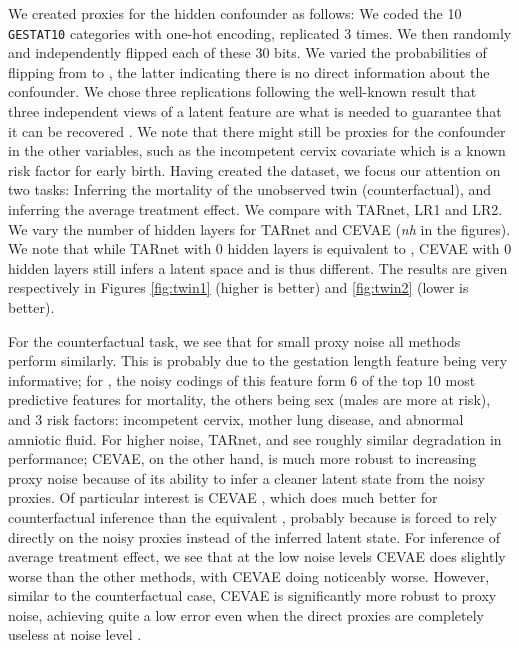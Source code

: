 \documentclass{article}
\begin{document}
We created proxies for the hidden confounder as follows: We coded the 10 \texttt{GESTAT10}  categories with one-hot encoding, replicated 3 times. We then randomly and independently flipped each of these 30 bits. We varied the probabilities of flipping from  to ,  the latter indicating there is no direct information about the confounder. We chose three replications following the well-known result that three independent views of a latent feature are what is needed to guarantee that it can be recovered \citep{kruskal1976more,allman2009identifiability,anandkumar2014tensor}. We note that there might still be proxies for the confounder in the other variables, such as the incompetent cervix covariate which is a known risk factor for early birth.
Having created the dataset, we focus our attention on two tasks: Inferring the mortality of the unobserved twin (counterfactual), and inferring the average treatment effect. We compare with TARnet, LR1 and LR2. We vary the number of hidden layers for TARnet and CEVAE (\emph{nh} in the figures). We note that while TARnet with 0 hidden layers is equivalent to , CEVAE with 0 hidden layers still infers a latent space and is thus different. The results are given respectively in Figures \ref{fig:twin1} (higher is better) and \ref{fig:twin2} (lower is better).

For the counterfactual task, we see that for small proxy noise all methods perform similarly. This is probably due to the gestation length feature being very informative; for , the noisy codings of this feature form 6 of the top 10 most predictive features for mortality, the others being sex (males are more at risk), and 3 risk factors: incompetent cervix, mother lung disease, and abnormal amniotic fluid.
For higher noise, TARnet,  and  see roughly similar degradation in performance;  CEVAE, on the other hand, is much more robust to increasing proxy noise because of its ability to infer a cleaner latent state from the noisy proxies. Of particular interest is CEVAE , which does much better for counterfactual inference than the equivalent , probably because  is forced to rely directly on the noisy proxies instead of the inferred latent state. 
For inference of average treatment effect, we see that at the low noise levels CEVAE does slightly worse than the other methods, with CEVAE  doing noticeably worse. However, similar to the counterfactual case, CEVAE is significantly more robust to proxy noise, achieving quite a low error even when the direct proxies are completely useless at noise level .
\end{document}
